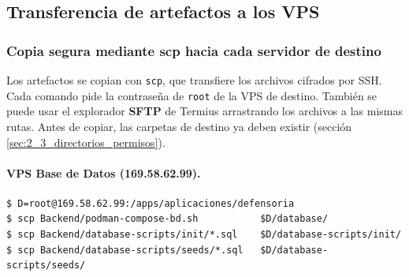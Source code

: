 \subsection{Transferencia de artefactos a los VPS}\label{sec:4_4_transferencia_vps}

\subsubsection{Copia segura mediante scp hacia cada servidor de destino}
Los artefactos se copian con \texttt{scp}, que transfiere los archivos cifrados por SSH. Cada comando pide la contraseña de \texttt{root} de la VPS de destino. También se puede usar el explorador \textbf{SFTP} de Termius arrastrando los archivos a las mismas rutas. Antes de copiar, las carpetas de destino ya deben existir (sección \ref{sec:2_3_directorios_permisos}).

\paragraph{VPS Base de Datos (169.58.62.99).}
\begin{lstlisting}
$ D=root@169.58.62.99:/apps/aplicaciones/defensoria
$ scp Backend/podman-compose-bd.sh           $D/database/
$ scp Backend/database-scripts/init/*.sql    $D/database-scripts/init/
$ scp Backend/database-scripts/seeds/*.sql   $D/database-scripts/seeds/
\end{lstlisting}

